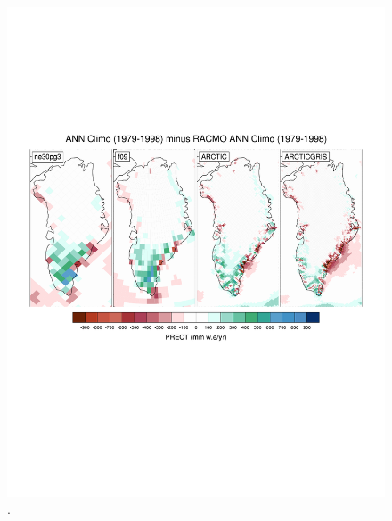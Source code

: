 \documentclass[draft]{agujournal2019}
\begin{document}
\begin{figure}[t]
\begin{center}
         \includegraphics[width=130mm]{figs/temp_PRECT.pdf}
\end{center}
\caption{.}
\label{fig:prect}
\end{figure}




\end{document}
